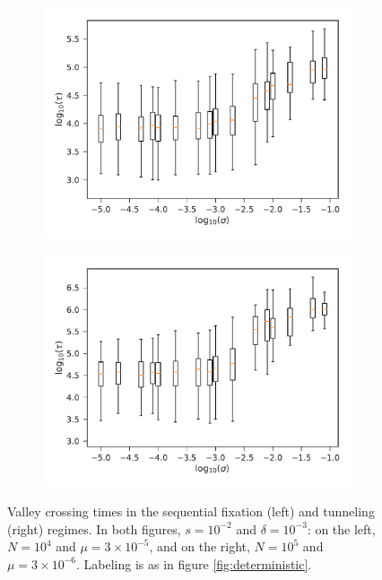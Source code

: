 \documentclass[rmp]{revtex4}
\begin{document}
\begin{spacing}{1.5}
\begin{figure}
\begin{subfigure}[b]{0.4\textwidth}
\includegraphics[width=\textwidth]{Figures/seq_fix.pdf}
\end{subfigure}
\begin{subfigure}[b]{0.4\textwidth}
\includegraphics[width=\textwidth]{Figures/neut_tunnel.pdf}
\end{subfigure}
\caption{Valley crossing times in the sequential fixation (left) and tunneling (right) regimes. In both figures, $s = 10^{-2}$ and $\delta = 10^{-3}$: on the left, $N = 10^4$ and $\mu = 3\times 10^{-5}$, and on the right, $N = 10^5$ and $\mu = 3\times 10^{-6}$. Labeling is as in figure \ref{fig:deterministic}.}
\label{fig:tunneling}
\end{figure}


\end{spacing}
\end{document}
